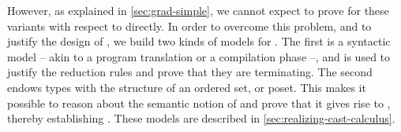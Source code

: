 \AP However, as explained in \cref{sec:grad-simple}, we cannot expect to prove 
for these  variants with respect to  directly.
In order to overcome this problem, and to justify the design of ,
we build two kinds of models for . The first%
 is a syntactic model
 – akin to a program translation or a compilation phase –,
and is used to justify the reduction rules and prove that they are terminating.
The second%
endows types with the structure of an ordered set, or poset. This makes it
possible to reason about the semantic notion of  and prove that it gives rise to ,
thereby establishing .
%
These models are described in \cref{sec:realizing-cast-calculus}.
